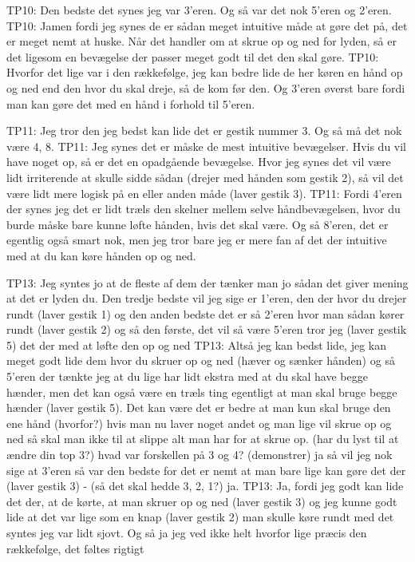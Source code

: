 TP10: Den bedste det synes jeg var 3’eren. Og så var det nok 5’eren og 2’eren.
TP10: Jamen fordi jeg synes de er sådan meget intuitive måde at gøre det på, det er meget nemt at huske. Når det handler om at skrue op og ned for lyden, så er det ligesom en bevægelse der passer meget godt til det den skal gøre. 
TP10: Hvorfor det lige var i den rækkefølge, jeg kan bedre lide de her køren en hånd op og ned end den hvor du skal dreje, så de kom før den. Og 3’eren øverst bare fordi man kan gøre det med en hånd i forhold til 5’eren.


TP11: Jeg tror den jeg bedst kan lide det er gestik nummer 3. Og så må det nok være 4, 8.
TP11: Jeg synes det er måske de mest intuitive bevægelser. Hvis du vil have noget op, så er det en opadgående bevægelse. Hvor jeg synes det vil være lidt irriterende at skulle sidde sådan (drejer med hånden som gestik 2), så vil det være lidt mere logisk på en eller anden måde (laver gestik 3).
TP11: Fordi 4’eren der synes jeg det er lidt træls den skelner mellem selve håndbevægelsen, hvor du burde måske bare kunne løfte hånden, hvis det skal være. Og så 8’eren, det er egentlig også smart nok, men jeg tror bare jeg er mere fan af det der intuitive med at du kan køre hånden op og ned. 


TP13: Jeg syntes jo at de fleste af dem der tænker man jo sådan det giver mening at det er lyden du. Den tredje bedste vil jeg sige er 1’eren, den der hvor du drejer rundt (laver gestik 1) og den anden bedste det er så 2’eren hvor man sådan kører rundt (laver gestik 2) og så den første, det vil så være 5’eren tror jeg (laver gestik 5) det der med at løfte den op og ned 
TP13: Altså jeg kan bedst lide, jeg kan meget godt lide dem hvor du skruer op og ned (hæver og sænker hånden) og så 5’eren der tænkte jeg at du lige har lidt ekstra med at du skal have begge hænder, men det kan også være en træls ting egentligt at man skal bruge begge hænder (laver gestik 5). Det kan være det er bedre at man kun skal bruge den ene hånd (hvorfor?) hvis man nu laver noget andet og man lige vil skrue op og ned så skal man ikke til at slippe alt man har for at skrue op. (har du lyst til at ændre din top 3?) hvad var forskellen på 3 og 4? (demonstrer) ja så vil jeg nok sige at 3’eren så var den bedste for det er nemt at man bare lige kan gøre det der (laver gestik 3) - (så det skal hedde 3, 2, 1?) ja.  
TP13: Ja, fordi jeg godt kan lide det der, at de kørte, at man skruer op og ned (laver gestik 3) og jeg kunne godt lide at det var lige som en knap (laver gestik 2) man skulle køre rundt med det syntes jeg var lidt sjovt. Og så ja jeg ved ikke helt hvorfor lige præcis den rækkefølge, det føltes rigtigt  


